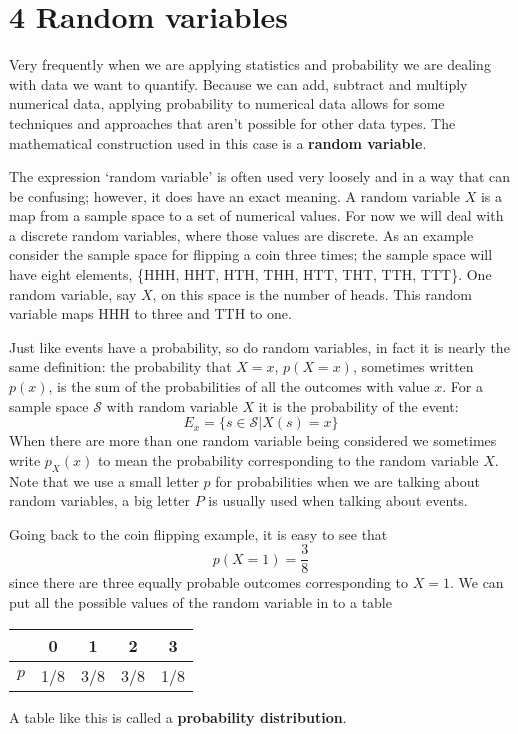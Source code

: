 \documentclass[11pt,a4paper]{scrartcl}
\begin{document}
\section*{4 Random variables}

Very frequently when we are applying statistics and probability we are
dealing with data we want to quantify. Because we can add, subtract
and multiply numerical data, applying probability to numerical data allows for some
techniques and approaches that aren't possible for other data
types. The mathematical construction used in this case is a
\textbf{random variable}.

The expression \lq{}random variable\rq{} is often used very loosely
and in a way that can be confusing; however, it does have an exact
meaning. A random variable $X$ is a map from a sample space to a set
of numerical values. For now we will deal with a discrete random
variables, where those values are discrete. As an example consider the
sample space for flipping a coin three times; the sample space will
have eight elements, \{HHH, HHT, HTH, THH, HTT, THT, TTH, TTT\}. One
random variable, say $X$, on this space is the number of heads. This
random variable maps HHH to three and TTH to one.

Just like events have a probability, so do random variables, in fact
it is nearly the same definition: the probability that $X=x$,
$p(X=x)$, sometimes written $p(x)$, is the sum of the probabilities of
all the outcomes with value $x$. For a sample space $\mathcal{S}$ with
random variable $X$ it is the probability of the event:
\begin{equation}
E_x=\{s\in \mathcal{S}|X(s)=x\}
\end{equation}
When there are more than one random variable being considered we
sometimes write $p_X(x)$ to mean the probability corresponding to the
random variable $X$. Note that we use a small letter $p$ for
probabilities when we are talking about random variables, a big letter
$P$ is usually used when talking about events.

Going back to the coin flipping example, it is easy to see that 
\begin{equation}
p(X=1)=\frac{3}{8}
\end{equation}
since there are three equally probable outcomes corresponding to
$X=1$. We can put all the possible values of the random variable in to
a table
\begin{center}
\begin{tabular}{c|cccc}
&0&1&2&3\\
\hline
$p$&1/8&3/8&3/8&1/8
\end{tabular}
\end{center}
A table like this is called a \textbf{probability distribution}.
\end{document}
